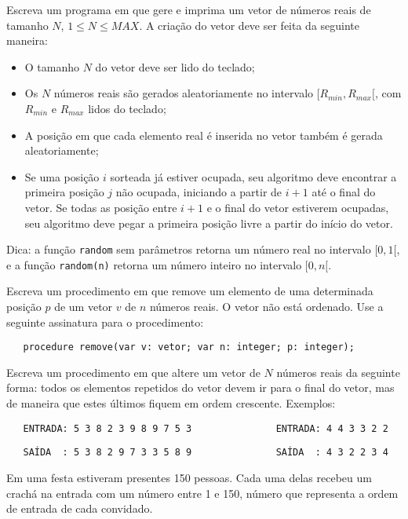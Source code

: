\item Escreva um programa em  que gere e imprima um
vetor de números reais de tamanho $N$, $1 \le N \le MAX$. A criação
do vetor deve ser feita da seguinte maneira:
\begin{itemize}
\item O tamanho $N$ do vetor deve ser lido do teclado; 
\item Os $N$ números reais são gerados aleatoriamente no
intervalo $[R_{min},R_{max}[$, com $R_{min}$ e $R_{max}$ lidos do teclado;
\item A posição em que cada elemento real é inserida no vetor também é gerada
      aleatoriamente;
\item Se uma posição $i$ sorteada já estiver ocupada, seu algoritmo deve
encontrar a primeira posição $j$ não ocupada, iniciando a partir de $i+1$ até
o final do vetor. Se todas as posição entre $i+1$ e o final do vetor
estiverem ocupadas, seu algoritmo deve pegar a primeira posição livre a
partir do início do vetor.
\end{itemize}

Dica: a função \verb|random| sem parâmetros retorna um número real no intervalo
$[0,1[$, e a função \verb|random(n)| retorna um número inteiro no intervalo
$[0,n[$.

\item Escreva um procedimento em  que remove um
  elemento de uma determinada posição $p$ de um vetor $v$ de $n$ números
  reais. O vetor não está ordenado. 
  Use a seguinte assinatura para o procedimento: 

\verb!   procedure remove(var v: vetor; var n: integer; p: integer);!


\item Escreva um procedimento em  que altere um
  vetor de $N$ números reais da seguinte forma: todos os elementos
  repetidos do vetor devem ir para o final do vetor, mas de maneira
  que estes últimos fiquem em ordem crescente. Exemplos:

\verb!   ENTRADA: 5 3 8 2 3 9 8 9 7 5 3               ENTRADA: 4 4 3 3 2 2!

\vspace*{-1mm}
\verb!   SAÍDA  : 5 3 8 2 9 7 3 3 5 8 9               SAÍDA  : 4 3 2 2 3 4!

\item Em uma festa estiveram presentes 150 pessoas. Cada uma delas recebeu
um crachá na entrada com um número entre 1 e 150, número que
representa a ordem de entrada de cada convidado.

